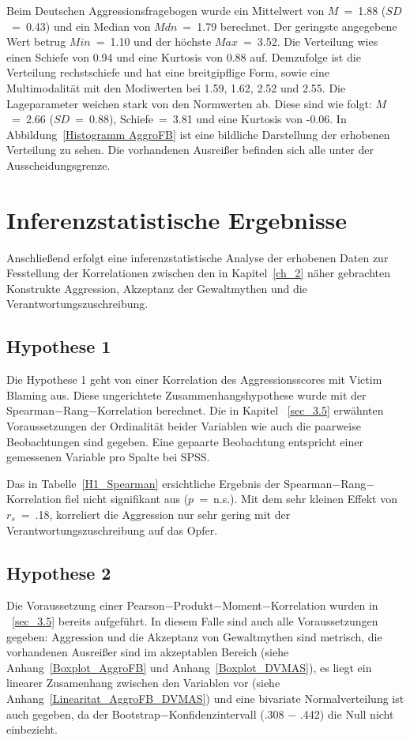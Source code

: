 
Beim Deutschen Aggressionsfragebogen wurde ein Mittelwert von $M$~=~1.88 ($SD$~=~0.43) und ein Median von $Mdn$~=~1.79 berechnet. Der geringste angegebene Wert betrug $Min$~=~1.10 und der höchste $Max$~=~3.52. Die Verteilung wies einen Schiefe von 0.94 und eine Kurtosis von 0.88 auf. Demzufolge ist die Verteilung rechstschiefe und hat eine breitgipflige Form, sowie eine Multimodalität mit den Modiwerten bei 1.59, 1.62, 2.52 und 2.55. Die Lageparameter weichen stark von den Normwerten ab. Diese sind wie folgt: $M$~=~2.66 ($SD$~=~0.88), Schiefe~=~3.81 und eine Kurtosis von -0.06. In Abbildung~\ref{Histogramm AggroFB} ist eine bildliche Darstellung der erhobenen Verteilung zu sehen. Die vorhandenen Ausreißer befinden sich alle unter der Ausscheidungsgrenze.


\section{Inferenzstatistische Ergebnisse}    \label{sec_4.2}
Anschließend erfolgt eine inferenzstatistische Analyse der erhobenen Daten zur Fesstellung der Korrelationen zwischen den in Kapitel~\ref{ch_2} näher gebrachten Konstrukte Aggression, Akzeptanz der Gewaltmythen und die Verantwortungszuschreibung. 


\subsection{Hypothese 1}    \label{subsec_4.2.1}
Die Hypothese 1 geht von einer Korrelation des Aggressionsscores mit Victim Blaming aus. Diese ungerichtete Zusammenhangshypothese wurde mit der Spearman$-$Rang$-$Korrelation berechnet. Die in Kapitel ~\ref{sec_3.5} erwähnten Voraussetzungen der Ordinalität beider Variablen wie auch die paarweise Beobachtungen sind gegeben. Eine gepaarte Beobachtung entspricht einer gemessenen Variable pro Spalte bei SPSS.


Das in Tabelle~\ref{H1_Spearman} ersichtliche Ergebnis der Spearman$-$Rang$-$Korrelation fiel nicht signifikant aus ($p$~=~n.s.). Mit dem sehr kleinen Effekt \parencite{Cohen_1992} von $r_{s}$~=~.18, korreliert die Aggression nur sehr gering mit der Verantwortungszuschreibung auf das Opfer.

\subsection{Hypothese 2}    \label{subsec_4.2.2}
Die Voraussetzung einer Pearson$-$Produkt$-$Moment$-$Korrelation wurden in ~\ref{sec_3.5} bereits aufgeführt. In diesem Falle sind auch alle Voraussetzungen gegeben: Aggression und die Akzeptanz von Gewaltmythen sind metrisch, die vorhandenen Ausreißer sind im akzeptablen Bereich (siehe Anhang~\ref{Boxplot_AggroFB} und Anhang~\ref{Boxplot_DVMAS}), 
es liegt ein linearer Zusamenhang zwischen den Variablen vor (siehe Anhang~\ref{Linearitat_AggroFB_DVMAS}) und eine bivariate Normalverteilung ist auch gegeben, da der Bootstrap$-$Konfidenzintervall (.308 $-$ .442) die Null nicht einbezieht.

